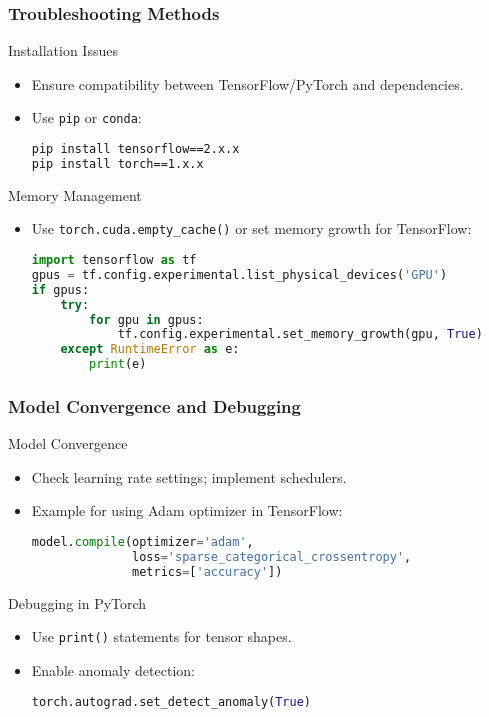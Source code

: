 \documentclass[aspectratio=169]{beamer}
\begin{document}
\begin{frame}[fragile]
    \frametitle{Troubleshooting Methods}
    \begin{block}{Installation Issues}
        \begin{itemize}
            \item Ensure compatibility between TensorFlow/PyTorch and dependencies.
            \item Use \texttt{pip} or \texttt{conda}:
            \begin{lstlisting}[language=bash]
pip install tensorflow==2.x.x
pip install torch==1.x.x
            \end{lstlisting}
        \end{itemize}
    \end{block}
    
    \begin{block}{Memory Management}
        \begin{itemize}
            \item Use \texttt{torch.cuda.empty\_cache()} or set memory growth for TensorFlow:
            \begin{lstlisting}[language=python]
import tensorflow as tf
gpus = tf.config.experimental.list_physical_devices('GPU')
if gpus:
    try:
        for gpu in gpus:
            tf.config.experimental.set_memory_growth(gpu, True)
    except RuntimeError as e:
        print(e)
            \end{lstlisting}
        \end{itemize}
    \end{block}
\end{frame}

\begin{frame}[fragile]
    \frametitle{Model Convergence and Debugging}
    \begin{block}{Model Convergence}
        \begin{itemize}
            \item Check learning rate settings; implement schedulers.
            \item Example for using Adam optimizer in TensorFlow:
            \begin{lstlisting}[language=python]
model.compile(optimizer='adam',
              loss='sparse_categorical_crossentropy',
              metrics=['accuracy'])
            \end{lstlisting}
        \end{itemize}
    \end{block}
    
    \begin{block}{Debugging in PyTorch}
        \begin{itemize}
            \item Use \texttt{print()} statements for tensor shapes.
            \item Enable anomaly detection:
            \begin{lstlisting}[language=python]
torch.autograd.set_detect_anomaly(True)
            \end{lstlisting}
        \end{itemize}
    \end{block}
\end{frame}
\end{document}
